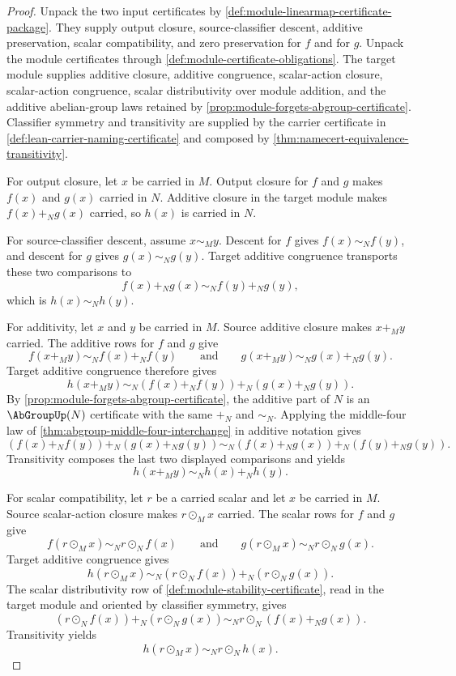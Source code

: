 \begin{proof}
Unpack the two input certificates by \autoref{def:module-linearmap-certificate-package}. They supply output closure, source-classifier descent, additive preservation, scalar compatibility, and zero preservation for $f$ and for $g$. Unpack the module certificates through \autoref{def:module-certificate-obligations}. The target module supplies additive closure, additive congruence, scalar-action closure, scalar-action congruence, scalar distributivity over module addition, and the additive abelian-group laws retained by \autoref{prop:module-forgets-abgroup-certificate}. Classifier symmetry and transitivity are supplied by the carrier certificate in \autoref{def:lean-carrier-naming-certificate} and composed by \autoref{thm:namecert-equivalence-transitivity}.

For output closure, let $x$ be carried in $M$. Output closure for $f$ and $g$ makes $f(x)$ and $g(x)$ carried in $N$. Additive closure in the target module makes $f(x)+_N g(x)$ carried, so $h(x)$ is carried in $N$.

For source-classifier descent, assume $x\sim_M y$. Descent for $f$ gives $f(x)\sim_N f(y)$, and descent for $g$ gives $g(x)\sim_N g(y)$. Target additive congruence transports these two comparisons to
$$
f(x)+_N g(x)\sim_N f(y)+_N g(y),
$$
which is $h(x)\sim_N h(y)$.

For additivity, let $x$ and $y$ be carried in $M$. Source additive closure makes $x+_M y$ carried. The additive rows for $f$ and $g$ give
$$
f(x+_M y)\sim_N f(x)+_N f(y)
\qquad\text{and}\qquad
g(x+_M y)\sim_N g(x)+_N g(y).
$$
Target additive congruence therefore gives
$$
h(x+_M y)\sim_N (f(x)+_N f(y))+_N(g(x)+_N g(y)).
$$
By \autoref{prop:module-forgets-abgroup-certificate}, the additive part of $N$ is an $\AbGroupUp(N)$ certificate with the same $+_N$ and $\sim_N$. Applying the middle-four law of \autoref{thm:abgroup-middle-four-interchange} in additive notation gives
$$
(f(x)+_N f(y))+_N(g(x)+_N g(y))
\sim_N
(f(x)+_N g(x))+_N(f(y)+_N g(y)).
$$
Transitivity composes the last two displayed comparisons and yields
$$
h(x+_M y)\sim_N h(x)+_N h(y).
$$

For scalar compatibility, let $r$ be a carried scalar and let $x$ be carried in $M$. Source scalar-action closure makes $r\odot_M x$ carried. The scalar rows for $f$ and $g$ give
$$
f(r\odot_M x)\sim_N r\odot_N f(x)
\qquad\text{and}\qquad
g(r\odot_M x)\sim_N r\odot_N g(x).
$$
Target additive congruence gives
$$
h(r\odot_M x)\sim_N (r\odot_N f(x))+_N(r\odot_N g(x)).
$$
The scalar distributivity row of \autoref{def:module-stability-certificate}, read in the target module and oriented by classifier symmetry, gives
$$
(r\odot_N f(x))+_N(r\odot_N g(x))\sim_N r\odot_N(f(x)+_N g(x)).
$$
Transitivity yields
$$
h(r\odot_M x)\sim_N r\odot_N h(x).
$$


\end{proof}
